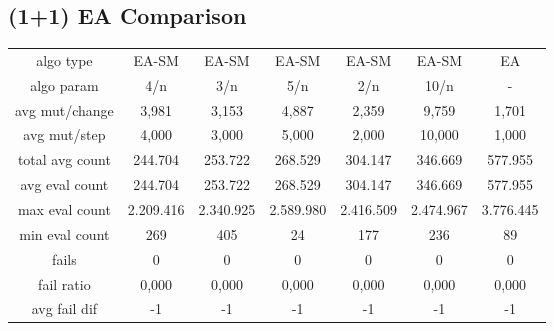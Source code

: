 \subsection{(1+1) EA Comparison}
\begin{tabular}[h]{ccccccc}
algo type&               EA-SM&        EA-SM&        EA-SM&        EA-SM&        EA-SM&           EA\\
algo param&                4/n&          3/n&          5/n&          2/n&         10/n&            -\\
avg mut/change&          3,981&        3,153&        4,887&        2,359&        9,759&        1,701\\
avg mut/step&            4,000&        3,000&        5,000&        2,000&       10,000&        1,000\\
\hline
total avg count&       244.704&      253.722&      268.529&      304.147&      346.669&      577.955\\
avg eval count&        244.704&      253.722&      268.529&      304.147&      346.669&      577.955\\
max eval count&      2.209.416&    2.340.925&    2.589.980&    2.416.509&    2.474.967&    3.776.445\\
min eval count&            269&          405&           24&          177&          236&           89\\
\hline
fails&                       0&            0&            0&            0&            0&            0\\
fail ratio&              0,000&        0,000&        0,000&        0,000&        0,000&        0,000\\
avg fail dif&               -1&           -1&           -1&           -1&           -1&           -1\\
\end{tabular}
